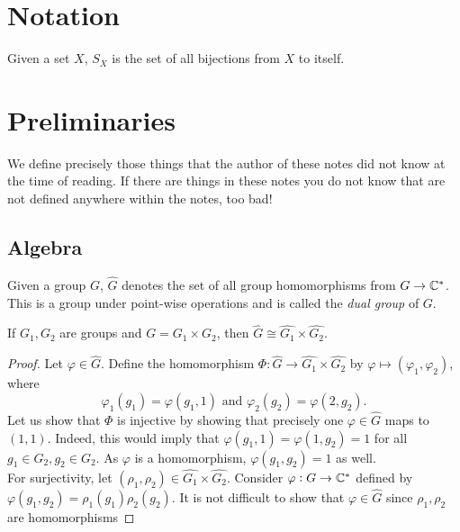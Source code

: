 \section{Notation}
	
	Given a set $X$, $S_X$ is the set of all bijections from $X$ to itself.

\section{Preliminaries}

	We define precisely those things that the author of these notes did not know at the time of reading. If there are things in these notes you do not know that are not defined anywhere within the notes, too bad!
	
	\subsection{Algebra}

		\begin{fdef}
			\label{def: dual group}
			Given a group $G$, $\hat{G}$ denotes the set of all group homomorphisms from $G \to \mathbb{C}^*$. This is a group under point-wise operations and is called the \emph{dual group} of $G$.
		\end{fdef}

		\begin{prop}
			If $G_1,G_2$ are groups and $G = G_1 \times G_2$, then $\hat{G} \cong \hat{G_1} \times \hat{G_2}$.
		\end{prop}
		\begin{proof}
			Let $\varphi \in \hat{G}$. Define the homomorphism $\Phi: \hat{G} \to \hat{G_1} \times \hat{G_2}$ by $\varphi \mapsto (\varphi_1,\varphi_2)$, where
			\[ \varphi_1(g_1) = \varphi(g_1,1) \text{ and } \varphi_2(g_2) = \varphi(2,g_2). \]
			Let us show that $\Phi$ is injective by showing that precisely one $\varphi \in \hat{G}$ maps to $(1,1)$. Indeed, this would imply that $\varphi(g_1,1) = \varphi(1,g_2) = 1$ for all $g_1 \in G_2, g_2 \in G_2$. As $\varphi$ is a homomorphism, $\varphi(g_1,g_2) = 1$ as well.\\
			For surjectivity, let $(\rho_1,\rho_2) \in \hat{G_1} \times \hat{G_2}$. Consider $\varphi : G \to \mathbb{C}^*$ defined by $\varphi(g_1,g_2) = \rho_1(g_1) \rho_2(g_2)$. It is not difficult to show that $\varphi \in \hat{G}$ since $\rho_1,\rho_2$ are homomorphisms
		\end{proof}

